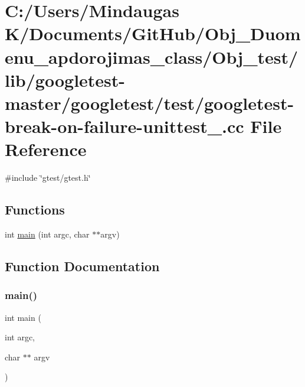 \hypertarget{_obj__test_2lib_2googletest-master_2googletest_2test_2googletest-break-on-failure-unittest___8cc}{}\section{C\+:/\+Users/\+Mindaugas K/\+Documents/\+Git\+Hub/\+Obj\+\_\+\+Duomenu\+\_\+apdorojimas\+\_\+class/\+Obj\+\_\+test/lib/googletest-\/master/googletest/test/googletest-\/break-\/on-\/failure-\/unittest\+\_\+.cc File Reference}
\label{_obj__test_2lib_2googletest-master_2googletest_2test_2googletest-break-on-failure-unittest___8cc}
{\ttfamily \#include \char`\"{}gtest/gtest.\+h\char`\"{}}\newline
\subsection*{Functions}
\begin{DoxyCompactItemize}
\item 
int \mbox{\hyperlink{_obj__test_2lib_2googletest-master_2googletest_2test_2googletest-break-on-failure-unittest___8cc_a3c04138a5bfe5d72780bb7e82a18e627}{main}} (int argc, char $\ast$$\ast$argv)
\end{DoxyCompactItemize}


\subsection{Function Documentation}
\mbox{\label{_obj__test_2lib_2googletest-master_2googletest_2test_2googletest-break-on-failure-unittest___8cc_a3c04138a5bfe5d72780bb7e82a18e627}} 
\subsubsection{\texorpdfstring{main()}{main()}}
{\footnotesize\ttfamily int main (\begin{DoxyParamCaption}\item[{int}]{argc,  }\item[{char $\ast$$\ast$}]{argv }\end{DoxyParamCaption})}

